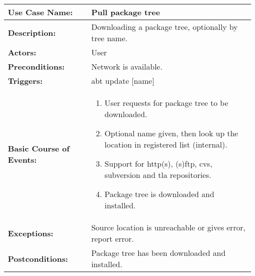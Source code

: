 
\begin{tabularx}{\linewidth}{|l|X|}
\hline
\textbf{Use Case Name:} & \textbf{Pull package tree} \\
\hline
\textbf{Description:} & 
Downloading a package tree, optionally by tree name. \\
\hline
\textbf{Actors:} & User \\
\hline
\textbf{Preconditions:} & 
Network is available. \\
\hline
\textbf{Triggers:} & abt update $[$name$]$  \\
\hline
\textbf{Basic Course of Events:} & 
\begin{minipage}{\linewidth} 
  \vspace{0.05em}
  \begin{enumerate}
    \item User requests for package tree to be downloaded.
    \item Optional name given, then look up the location in registered list (internal).
    \item Support for http(s), (s)ftp, cvs, subversion and tla repositories.
    \item Package tree is downloaded and installed.
  \end{enumerate}
  \vspace{0.05em}
\end{minipage}
\\
\hline
\textbf{Exceptions:} & 
Source location is unreachable or gives error, report error. \\
\hline 
\textbf{Postconditions:} &
Package tree has been downloaded and installed.
\\
\hline
\end{tabularx}


